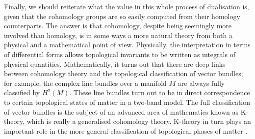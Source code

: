 Finally, we should reiterate what the value in this whole process of dualisation is, given that the cohomology groups are so easily computed from their homology counterparts. The answer is that cohomology, despite being seemingly more involved than homology, is in some ways a more natural theory from both a physical and a mathematical point of view. Physically, the interpretation in terms of differential forms allows topological invariants to be written as integrals of physical quantities. Mathematically, it turns out that there are deep links between cohomology theory and the topological classification of vector bundles; for example, the complex line bundles over a manifold $M$ are always fully classified by $H^2(M)$. These line bundles turn out to be in direct correspondence to certain topological states of matter in a two-band model. The full classification of vector bundles is the subject of an advanced area of mathematics known as K-theory, which is really a generalised cohomology theory. K-theory in turn plays an important role in the more general classification of topological phases of matter \cite{FreedMoore_K-theory,Thiang_K-theory}.
